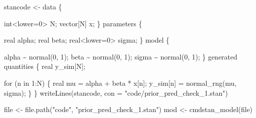 \documentclass[
  10pt,
  italian,
  a4paper,
  extrafontsizes,onecolumn,openright
  ]{memoir}
\newenvironment{Shaded}{\begin{snugshade}}{\end{snugshade}}
\newcommand{\AttributeTok}[1]{\textcolor[rgb]{0.77,0.63,0.00}{#1}}
\newcommand{\DecValTok}[1]{\textcolor[rgb]{0.00,0.00,0.81}{#1}}
\newcommand{\FunctionTok}[1]{\textcolor[rgb]{0.00,0.00,0.00}{#1}}
\newcommand{\NormalTok}[1]{#1}
\newcommand{\OtherTok}[1]{\textcolor[rgb]{0.56,0.35,0.01}{#1}}
\newcommand{\SpecialCharTok}[1]{\textcolor[rgb]{0.00,0.00,0.00}{#1}}
\newcommand{\StringTok}[1]{\textcolor[rgb]{0.31,0.60,0.02}{#1}}
\begin{document}
\begin{Shaded}
\end{Shaded}

\begin{Shaded}
\begin{Highlighting}[]
\NormalTok{stancode }\OtherTok{\textless{}{-}} \StringTok{\textquotesingle{}}
\StringTok{data \{}

\StringTok{  int\textless{}lower=0\textgreater{} N;  }
\StringTok{  vector[N] x; }
\StringTok{  }
\StringTok{\}}
\StringTok{parameters \{}

\StringTok{  real alpha;}
\StringTok{  real beta;}
\StringTok{  real\textless{}lower=0\textgreater{} sigma;}
\StringTok{  }
\StringTok{\}}
\StringTok{model \{}

\StringTok{  alpha \textasciitilde{} normal(0, 1);}
\StringTok{  beta \textasciitilde{} normal(0, 1);}
\StringTok{  sigma \textasciitilde{} normal(0, 1);}
\StringTok{  }
\StringTok{\}}
\StringTok{generated quantities \{}
\StringTok{  real y\_sim[N];}

\StringTok{  for (n in 1:N) \{}
\StringTok{    real mu = alpha + beta * x[n];}
\StringTok{    y\_sim[n] = normal\_rng(mu, sigma);}
\StringTok{  \}}
\StringTok{\}}
\StringTok{\textquotesingle{}}
\FunctionTok{writeLines}\NormalTok{(stancode, }\AttributeTok{con =} \StringTok{"code/prior\_pred\_check\_1.stan"}\NormalTok{)}
\end{Highlighting}
\end{Shaded}

\begin{Shaded}
\begin{Highlighting}[]
\NormalTok{file }\OtherTok{\textless{}{-}} \FunctionTok{file.path}\NormalTok{(}\StringTok{"code"}\NormalTok{, }\StringTok{"prior\_pred\_check\_1.stan"}\NormalTok{)}
\NormalTok{mod }\OtherTok{\textless{}{-}} \FunctionTok{cmdstan\_model}\NormalTok{(file)}
\end{Highlighting}
\end{Shaded}

\begin{Shaded}
\end{Shaded}
\end{document}

